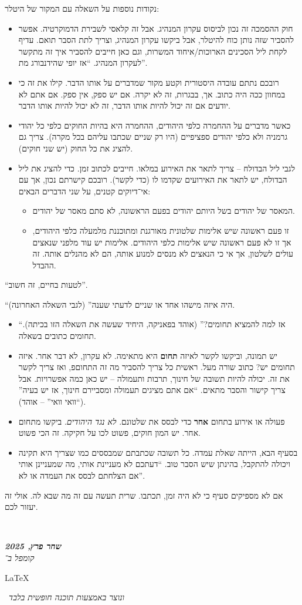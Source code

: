 \documentclass[]{article}
\newcommand\en[1] {\begin{otherlanguage}{english}#1\end{otherlanguage}}
\newcommand\ndoc  {\dotfill \\ \vfil {\begin{center}
            {\textbf{\textit{שחר פרץ, 2025}} \\
                \scriptsize \textit{קומפל ב־}\en{\LaTeX}\,\textit{ ונוצר באמצעות תוכנה חופשית בלבד}}
    \end{center}} \vfil	}
\theoremstyle{definition}
\begin{document}
    נקודות נוספות על השאלה עם המקור של היטלר: 
    \begin{itemize}
        \item חוק ההסמכה זה נכון לביסוס עקרון המנהיג. אבל זה קלאסי לשבירת הדמוקרטיה. אפשר להסביר שזה נותן כוח להיטלר, אבל ביקשו עקרון המנהיג, וצריך לתת הסבר תואם. עדיף לקחת ליל הסכינים הארוכות/איחוד המשרות, וגם כאן חייבים להסביר איך זה מתקשר לעקרון המנהיג. ``אז יופי שהידנבורג מת''. 
        \item 
        רובכם נתתם עובדה היסטורית וקטע מקור שמדברים על אותו הדבר. קילו את זה כי במחוון ככה היה כתוב. אך, בבגרות, זה לא יקרה. אם יש ספק, אין ספק. אם אתם לא יודעים אם זה יכול להיות אותו הדבר, זה לא יכול להיות אותו הדבר. 
        \item כאשר מדברים על ההחמרה כלפי היהודים, ההחמרה היא בהיות החוקים כלפי כל יהודי גרמניה ולא כלפי יהודים ספציפיים (היו רק שניים שכתבו עליהם בכל מקרה). צריך גם להציג את כל החוק (יש שני חוקים). 
        \item לגבי ליל הבדולח – צריך לתאר את האירוע במלאו. חייבים לכתוב זמן. כדי להציג את ליל הבדולח, יש לתאר את האירועים שקדמו לו (כדי לקשר). רובכם קישרתם נכון, אך עם אי־דיוקים קטנים, על שני הדברים הבאים: 
        \begin{itemize}
            \item המאסר של יהודים בשל היותם יהודים בפעם הראשונה, לא סתם מאסר של יהודים. 
            \item זו פעם ראשונה שיש אלימות שלטונית מאורגנת ומתוכננת מלמעלה כלפי היהודים, אך זו לא פעם ראשונה שיש אלימות כלפי היהודים. אלימות יש עוד מלפני שנאצים עולים לשלטון, אך אי כי הנאצים לא מנסים למנוע אותה, הם לא מהנלים אותה. זה ההבדל. 
        \end{itemize}
    \end{itemize}
    
    ``לטעות בחיים, זה חשוב''. 
    
    ``היה איזה מישהו אחד או שניים לדעתי שענה'' (לגבי השאלה האחרונה). 
    
    \begin{itemize}
        \item ``אז למה להמציא תחומים?'' (אוהד בפאניקה, היחיד שעשה את השאלה הזו בכיתה). תחומים כתובים בשאלה. 
        \item יש תמונה, וביקשו לקשר לאיזה \textbf{תחום} היא מתאימה. לא עקרון, לא דבר אחר. איזה תחומים יש? כתוב שורה מעל. ראשית כל צריך להסביר מה זה התחוםפ, ואז צריך לקשר את זה. יכולה להיות תשובה של חינוך, תרבות ותעמולה – יש כאן כמה אפשרויות. אבל צריך קישור והסבר מתאים. ``אם אתם מציגים תעמולה ומסביירם חינוך, אז יש בעיה'' (``וואי וואי'' – אוהד). 
        \item פעולה או אירוע בתחום \textbf{אחר} כדי לבסס את שלטונם. \textit{לא נגד היהודים}. ביקשו מתחום אחר. יש המון חוקים, פשוט לכו על חקיקה. זה הכי פשוט. 
        \item בסעיף הבא, הייתה שאלת עמדה. כל תשובה שכתבתם שמבססים כמו שצריך היא תקינה ויכולה להתקבל, בהינתן שיש הסבר טוב. ``דעתכם לא מעניינת אותי, מה שמעניינן אותי אם הצלחתם לבסס את העמדה או לא''. 
    \end{itemize}
    
    
    אם לא מספיקים סעיף כי לא היה זמן, תכתבו. שרית תעשה עם זה מה שבא לה. אולי זה יעזור לכם. 
    
    
    \ndoc
\end{document}
